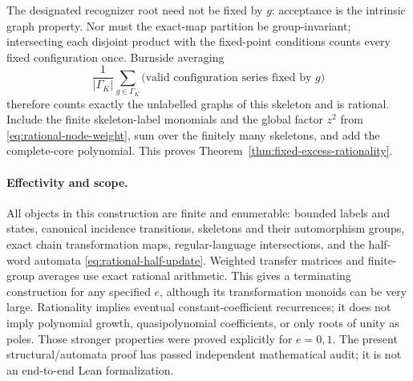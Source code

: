 The designated recognizer root need not be fixed by $g$: acceptance
is the intrinsic graph property.  Nor must the exact-map partition
be group-invariant; intersecting each disjoint product with the
fixed-point conditions counts every fixed configuration once.
Burnside averaging
\[
 \frac1{|\Gamma_K|}\sum_{g\in\Gamma_K}
 \bigl(\text{valid configuration series fixed by }g\bigr)
\]
therefore counts exactly the unlabelled graphs of this skeleton
and is rational.  Include the finite skeleton-label monomials
and the global factor $z^2$ from \eqref{eq:rational-node-weight},
sum over the finitely many skeletons, and add the complete-core
polynomial.  This proves Theorem~\ref{thm:fixed-excess-rationality}.

\paragraph{Effectivity and scope.}
All objects in this construction are finite and enumerable: bounded
labels and states, canonical incidence transitions, skeletons and
their automorphism groups, exact chain transformation maps,
regular-language intersections, and the half-word automata
\eqref{eq:rational-half-update}.  Weighted transfer matrices and
finite-group averages use exact rational arithmetic.  This gives
a terminating construction for any specified $e$, although its
transformation monoids can be very large.  Rationality implies
eventual constant-coefficient recurrences; it does not imply
polynomial growth, quasipolynomial coefficients, or only roots of
unity as poles.  Those stronger properties were proved explicitly
for $e=0,1$.  The present structural/automata proof has passed
independent mathematical audit; it is not an end-to-end Lean
formalization.
